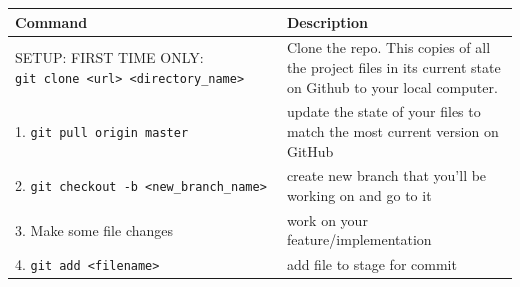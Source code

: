 \documentclass[]{book}
\begin{document}
\begin{longtable}[]{@{}ll@{}}
\toprule
\begin{minipage}[b]{0.34\columnwidth}\raggedright
Command\strut
\end{minipage} & \begin{minipage}[b]{0.60\columnwidth}\raggedright
Description\strut
\end{minipage}\tabularnewline
\midrule
\endhead
\begin{minipage}[t]{0.34\columnwidth}\raggedright
SETUP: FIRST TIME ONLY: \texttt{git\ clone\ \textless{}url\textgreater{}\ \textless{}directory\_name\textgreater{}}\strut
\end{minipage} & \begin{minipage}[t]{0.60\columnwidth}\raggedright
Clone the repo. This copies of all the project files in its current state on Github to your local computer.\strut
\end{minipage}\tabularnewline
\begin{minipage}[t]{0.34\columnwidth}\raggedright
1. \texttt{git\ pull\ origin\ master}\strut
\end{minipage} & \begin{minipage}[t]{0.60\columnwidth}\raggedright
update the state of your files to match the most current version on GitHub\strut
\end{minipage}\tabularnewline
\begin{minipage}[t]{0.34\columnwidth}\raggedright
2. \texttt{git\ checkout\ -b\ \textless{}new\_branch\_name\textgreater{}}\strut
\end{minipage} & \begin{minipage}[t]{0.60\columnwidth}\raggedright
create new branch that you'll be working on and go to it\strut
\end{minipage}\tabularnewline
\begin{minipage}[t]{0.34\columnwidth}\raggedright
3. Make some file changes\strut
\end{minipage} & \begin{minipage}[t]{0.60\columnwidth}\raggedright
work on your feature/implementation\strut
\end{minipage}\tabularnewline
\begin{minipage}[t]{0.34\columnwidth}\raggedright
4. \texttt{git\ add\ \textless{}filename\textgreater{}}\strut
\end{minipage} & \begin{minipage}[t]{0.60\columnwidth}\raggedright
add file to stage for commit\strut
\end{minipage}\tabularnewline

\end{longtable}
\end{document}
